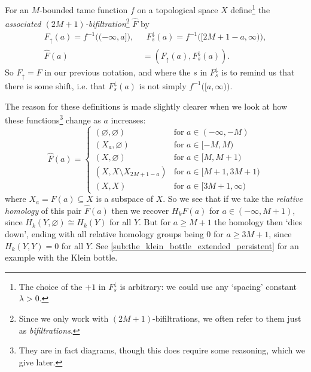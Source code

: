 \documentclass[12pt]{article}
\numberwithin{equation}{subsection}
\numberwithin{theorem}{subsection}
\numberwithin{lemma}{subsection}
\numberwithin{corollary}{subsection}
\numberwithin{definition}{subsection}
\numberwithin{example}{subsection}
\numberwithin{note}{subsection}
\newcommand{\Fup}{F_\uparrow}
\newcommand{\Fdown}{F^\downarrow_s}
\newcommand{\Fpaira}{(\Fup(a),\Fdown(a))}
\begin{document}
        \begin{definition}\label{df:bifiltration}
            For an $M$-bounded tame function $f$ on a topological space $X$ define\footnote{
                The choice of the $+1$ in $\Fdown$ is arbitrary: we could use any `spacing' constant $\lambda>0$.
            } the \emph{associated $(2M+1)$-bifiltration}\footnote{
                Since we only work with $(2M+1)$-bifiltrations, we often refer to them just as \emph{bifiltrations}.
            } \emph{$\widehat{F}$} by
            \begin{align*}
                \Fup(a) = f^{-1}\big((-\infty,a]\big),\,&\,\,\,\Fdown(a) = f^{-1}\big([2M+1-a,\infty)\big),\\
                \widehat{F}(a)&=\Fpaira.
            \end{align*}
            So $\Fup=F$ in our previous notation, and where the $s$ in $\Fdown$ is to remind us that there is some shift, i.e. that $\Fdown(a)$ is not simply $f^{-1}\big([a,\infty)\big)$.
        \end{definition}

        The reason for these definitions is made slightly clearer when we look at how these functions\footnote{
            They are in fact diagrams, though this does require some reasoning, which we give later.
        } change as $a$ increases:
        \begin{equation}\label{eq:what-happens-to-fpair-as-a-grows}
            \widehat{F}(a)=
            \begin{cases}
                (\varnothing,\varnothing) &\mbox{for }a\in(-\infty,-M)\\
                (X_a,\varnothing) &\mbox{for }a\in[-M,M)\\
                (X,\varnothing) &\mbox{for }a\in [M,M+1)\\
                (X,X\setminus X_{2M+1-a}) &\mbox{for }a\in[M+1,3M+1)\\
                (X,X) &\mbox{for }a\in[3M+1,\infty)
            \end{cases}
        \end{equation}
        where $X_a=F(a)\subseteq X$ is a subspace of $X$.
        So we see that if we take the \emph{relative homology} of this pair $\widehat{F}(a)$ then we recover $H_kF(a)$ for \mbox{$a\in(-\infty,M+1)$}, since $H_k(Y,\varnothing)\cong H_k(Y)$ for all $Y$.
        But for $a\geqslant M+1$ the homology then `dies down', ending with all relative homology groups being $0$ for $a\geqslant 3M+1$, since $H_k(Y,Y)=0$ for all $Y$.
        See \cref{sub:the_klein_bottle_extended_persistent} for an example with the Klein bottle.
\end{document}
